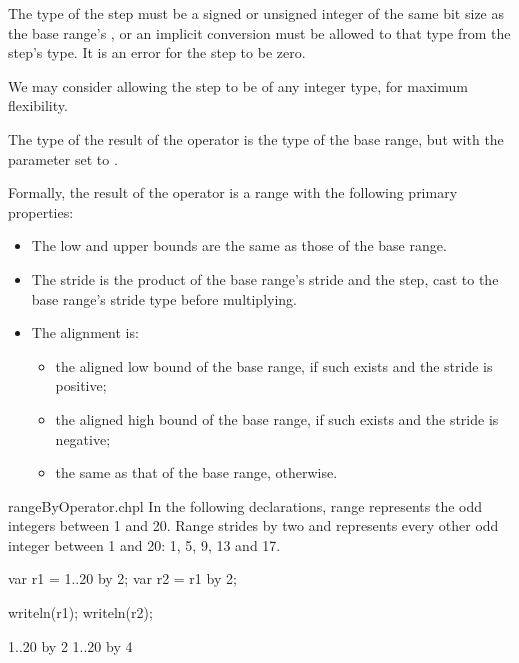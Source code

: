 The type of the step must be a signed or unsigned integer of the same
bit size as the base range's , or an implicit conversion must be allowed
to that type from the step's type.
It is an error for the step to be zero.

\begin{future}
We may consider allowing the step to be of any integer type,
for maximum flexibility.
\end{future}

The type of the result of the  operator is the type of the
base range, but with the  parameter set to .

Formally, the result of the  operator is a range with the following
primary properties:

\begin{itemize}

\item The low and upper bounds are the same as those of the base range.

\item The stride is the product of the base range's stride
      and the step, cast to the base range's stride type before multiplying.

\item The alignment is:

  \begin{itemize}
 
  \item the aligned low bound of the base range, if such exists
        and the stride is positive;

  \item the aligned high bound of the base range, if such exists
        and the stride is negative;

  \item the same as that of the base range, otherwise.

  \end{itemize}

\end{itemize}

\begin{chapelexample}{rangeByOperator.chpl}
In the following declarations, range  represents the odd integers
between 1 and 20. Range  strides  by two and represents
every other odd integer between 1 and 20: 1, 5, 9, 13 and 17.
\begin{chapel}
var r1 = 1..20 by 2;
var r2 = r1 by 2;
\end{chapel}
\begin{chapelpost}
writeln(r1);
writeln(r2);
\end{chapelpost}
\begin{chapeloutput}
1..20 by 2
1..20 by 4
\end{chapeloutput}
\end{chapelexample}

